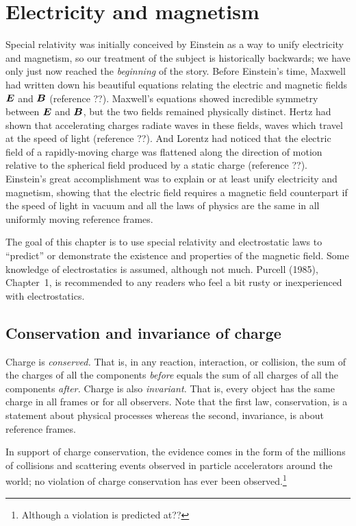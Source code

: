 \chapter{Electricity and magnetism}
\label{chap:electricity}

Special relativity was initially conceived by Einstein as a way to
unify electricity and magnetism, so our treatment of the subject is
historically backwards; we have only just now reached the {\em
beginning\/} of the story.  Before Einstein's time, Maxwell had
written down his beautiful equations relating the electric and
magnetic fields $\mbox{\boldmath $E$}$ and $\mbox{\boldmath $B$}$ (reference ??).  Maxwell's
equations showed incredible symmetry between $\mbox{\boldmath $E$}$ and $\mbox{\boldmath $B$}$,
but the two fields remained physically distinct.  Hertz had shown that
accelerating charges radiate waves in these fields, waves which travel
at the speed of light (reference ??).  And Lorentz had noticed that
the electric field of a rapidly-moving charge was flattened along the
direction of motion relative to the spherical field produced by a
static charge (reference ??).  Einstein's great accomplishment was to
explain or at least unify electricity and magnetism, showing that the
electric field requires a magnetic field counterpart if the speed of
light in vacuum and all the laws of physics are the same in all
uniformly moving reference frames.

The goal of this chapter is to use special relativity and
electrostatic laws to ``predict'' or demonstrate the existence and
properties of the magnetic field.  Some knowledge of electrostatics is
assumed, although not much.  Purcell (1985), Chapter~1, is recommended
to any readers who feel a bit rusty or inexperienced with
electrostatics.


\section{Conservation and invariance of charge}

Charge is {\em conserved.\/} That is, in any reaction, interaction, or
collision, the sum of the charges of all the components {\em before\/}
equals the sum of all charges of all the components {\em after.\/}
Charge is also {\em invariant.\/} That is, every object has the same
charge in all frames or for all observers.  Note that the first law,
conservation, is a statement about physical processes whereas the
second, invariance, is about reference frames.

In support of charge conservation, the evidence comes in the form of the
millions of collisions and scattering events observed in particle
accelerators around the world; no violation of charge conservation has
ever been observed.\footnote{Although a violation is predicted
at??}

